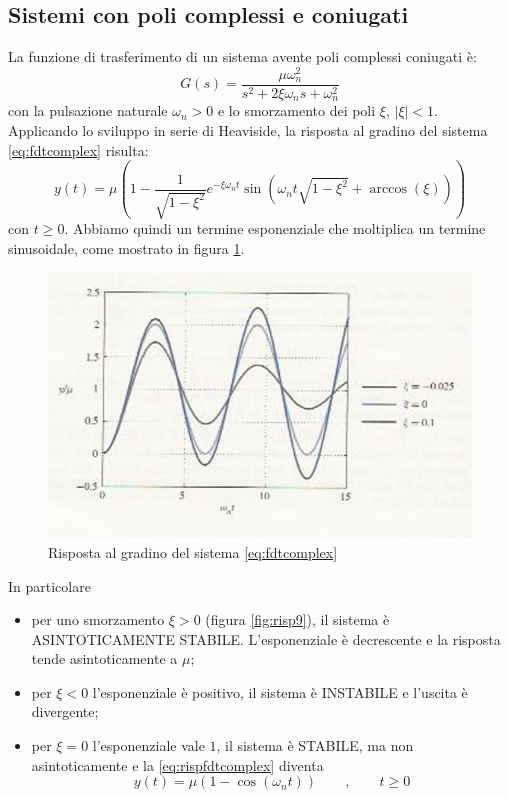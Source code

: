 \documentclass[a4paper]{report}
\begin{document}
\subsection{Sistemi con poli complessi e coniugati}
La funzione di trasferimento di un sistema avente poli complessi
coniugati \`e:
\begin{equation}\label{eq:fdtcomplex}
  G(s) = \dfrac{\mu \omega^2_n}{s^2 + 2 \xi \omega_n s + \omega^2_n}
\end{equation}
con la pulsazione naturale $\omega_n > 0$ e lo smorzamento dei poli
$\xi$, $|\xi| < 1$. Applicando lo sviluppo in serie di Heaviside, la
risposta al gradino del sistema \ref{eq:fdtcomplex} risulta: 
\begin{equation}\label{eq:rispfdtcomplex}
  y(t) = \mu \left ( 1-\frac{1}{\sqrt{1-\xi^2}}e^{-\xi \omega_n t}\sin
  \left ( \omega_n t\sqrt{1-\xi^2} + \arccos(\xi) \right) \right)
\end{equation}
con $t \geq 0$. Abbiamo quindi un termine esponenziale che moltiplica un
termine sinusoidale, come mostrato in figura \ref{fig:risp8}.
\begin{figure}[!h]
  \begin{center}
    \includegraphics[scale=0.5]{./figures/rispscal8.png}
    \caption{Risposta al gradino del sistema \ref{eq:fdtcomplex}}
    \label{fig:risp8}
  \end{center}
\end{figure} 
In particolare
\begin{itemize}
\item per uno smorzamento $\xi > 0$ (figura \ref{fig:risp9}), il
  sistema \`e ASINTOTICAMENTE STABILE. L'esponenziale \`e decrescente e
  la risposta tende asintoticamente a $\mu$; 
\item per $\xi < 0$ l'esponenziale \`e positivo, il sistema \`e
  INSTABILE e l'uscita \`e divergente; 
\item per $\xi = 0$ l'esponenziale vale $1$, il sistema \`e STABILE,
  ma non asintoticamente e la \ref{eq:rispfdtcomplex} diventa
  \[
    y(t) = \mu(1-\cos(\omega_n t))\qquad , \qquad t\geq0
  \]
\end{itemize}
\end{document}
